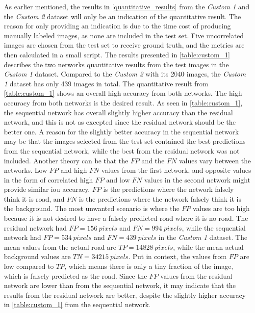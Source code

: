 \documentclass[USenglish]{ifimaster}  %
\begin{document}
As earlier mentioned, the results in \vref{quantitative_results} from the \textit{Custom 1} and the \textit{Custom 2} dataset will only be an indication of the quantitative result. The reason for only providing an indication is due to the time cost of producing manually labeled images, as none are included in the test set. Five uncorrelated images are chosen from the test set to receive ground truth, and the metrics are then calculated in a small script. The results presented in \vref{table:custom_1} describes the two networks quantitative results from the test images in the \textit{Custom 1} dataset. Compared to the \textit{Custom 2} with its 2040 images, the \textit{Custom 1} dataset has only 439 images in total. The quantitative result from \vref{table:custom_1} shows an overall high accuracy from both networks. The high accuracy from both networks is the desired result. As seen in \vref{table:custom_1}, the sequential network has overall slightly higher accuracy than the residual network, and this is not as excepted since the residual network should be the better one. A reason for the slightly better accuracy in the sequential network may be that the images selected from the test set contained the best predictions from the sequential network, while the best from the residual network was not included. Another theory can be that the $FP$ and the $FN$ values vary between the networks. Low $FP$ and high $FN$ values from the first network, and opposite values in the form of correlated high $FP$ and low $FN$ values in the second network might provide similar \ac{iou} accuracy. $FP$ is the predictions where the network falsely think it is road, and $FN$ is the predictions where the network falsely think it is the background. The most unwanted scenario is where the $FP$ values are too high because it is not desired to have a falsely predicted road where it is no road. The residual network had $FP=156\ pixels$ and $FN=994\ pixels$, while the sequential network had $FP=534\ pixels$ and $FN=439\ pixels$ in the \textit{Custom 1} dataset. The mean values from the actual road are $TP=14828\ pixels$, while the mean actual background values are $TN=34215\ pixels$. Put in context, the values from $FP$ are low compared to $TP$, which means there is only a tiny fraction of the image, which is falsely predicted as the road. Since the $FP$ values from the residual network are lower than from the sequential network, it may indicate that the results from the residual network are better, despite the slightly higher accuracy in \cref{table:custom_1} from the sequential network. 
\end{document}
